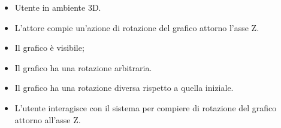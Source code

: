 \UCdsc
{ %
    \begin{itemize}
        \item Utente in ambiente 3D.
    \end{itemize}
}
{ %
    \begin{itemize}
        \item L'attore compie un'azione di rotazione del grafico attorno l'asse Z.
    \end{itemize}
}
{ %
    \begin{itemize}
        \item Il grafico è visibile;
        \item Il grafico ha una rotazione arbitraria.
    \end{itemize}
}
{ %
    \begin{itemize}
        \item Il grafico ha una rotazione diversa rispetto a quella iniziale.
    \end{itemize}
}
{ %
    \begin{itemize}
        \item L'utente interagisce con il sistema per compiere di rotazione del grafico attorno all'asse Z.
    \end{itemize}
}
    
